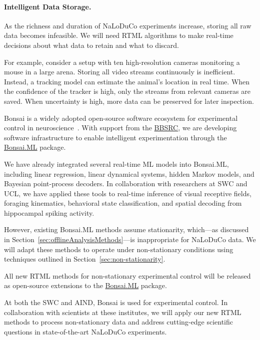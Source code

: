 \paragraph{Intelligent Data Storage.}
As the richness and duration of NaLoDuCo experiments increase, storing all raw data becomes infeasible.
%
We will need RTML algorithms to make real-time decisions about what data to retain and what to discard.

%
For example, consider a setup with ten high-resolution cameras monitoring a mouse in a large arena.
%
Storing all video streams continuously is inefficient.
%
Instead, a tracking model can estimate the animal's location in real time.
%
When the confidence of the tracker is high, only the streams from relevant cameras are saved.
%
When uncertainty is high, more data can be preserved for later inspection.


Bonsai is a widely adopted open-source software ecosystem for experimental control in neuroscience~\citep{lopesEtAl15}.
%
With support from the
\href{https://gow.bbsrc.ukri.org/grants/AwardDetails.aspx?FundingReference=BB\%2FW019132\%2F1}{BBSRC},
we are developing software infrastructure to enable intelligent experimentation through the
\href{https://bonsai-rx.org/machinelearning/}{Bonsai.ML} package.

%
We have already integrated several real-time ML models into Bonsai.ML, including linear regression, linear dynamical systems, hidden Markov models, and Bayesian point-process decoders.
%
In collaboration with researchers at SWC and UCL, we have applied these tools to real-time inference of visual receptive fields, foraging kinematics, behavioral state classification, and spatial decoding from hippocampal spiking activity.

%
However, existing Bonsai.ML methods assume stationarity, which—as discussed in Section~\ref{sec:offlineAnalysisMethods}—is inappropriate for NaLoDuCo data.
%
We will adapt these methods to operate under non-stationary conditions using techniques outlined in Section~\ref{sec:non-stationarity}.

%
All new RTML methods for non-stationary experimental control will be released as open-source extensions to the
\href{https://bonsai-rx.org/machinelearning/}{Bonsai.ML} package.

%
At both the SWC and AIND, Bonsai is used for experimental control. In
collaboration with scientists at these institutes, we will apply our new RTML
methods to process non-stationary data and address cutting-edge scientific
questions in state-of-the-art NaLoDuCo experiments.

